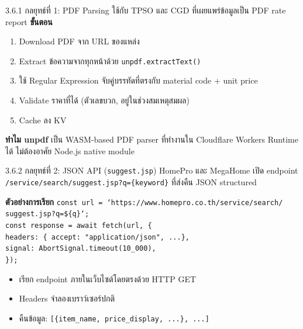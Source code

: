 \documentclass[aspectratio=169,11pt]{beamer}
\begin{document}
\begin{frame}{3.6.1 กลยุทธ์ที่ 1: PDF Parsing}
  ใช้กับ TPSO และ CGD ที่เผยแพร่ข้อมูลเป็น PDF rate report
  \vspace{0.3em}
  \textbf{ขั้นตอน}
  \begin{enumerate}
    \item Download PDF จาก URL ของแหล่ง
    \item Extract ข้อความจากทุกหน้าด้วย \texttt{unpdf.extractText()}
    \item ใช้ Regular Expression จับคู่บรรทัดที่ตรงกับ material code + unit price
    \item Validate ราคาที่ได้ (ตัวเลขบวก, อยู่ในช่วงสมเหตุสมผล)
    \item Cache ลง KV
  \end{enumerate}
  \vspace{0.3em}
  \begin{block}{\textbf{ทำไม unpdf}}
    เป็น WASM-based PDF parser ที่ทำงานใน Cloudflare Workers Runtime ได้
    ไม่ต้องอาศัย Node.js native module
  \end{block}
\end{frame}

\begin{frame}{3.6.2 กลยุทธ์ที่ 2: JSON API (\texttt{suggest.jsp})}
  HomePro และ MegaHome เปิด endpoint
  \texttt{/service/search/suggest.jsp?q=\{keyword\}} ที่ส่งคืน JSON structured
  \vspace{0.3em}
  \begin{exampleblock}{\textbf{ตัวอย่างการเรียก}}
  \footnotesize
  \texttt{const url = `https://www.homepro.co.th/service/search/} \\
  \texttt{\quad suggest.jsp?q=\$\{q\}`;} \\
  \texttt{const response = await fetch(url, \{} \\
  \texttt{\quad headers: \{ accept: "application/json", ...\},} \\
  \texttt{\quad signal: AbortSignal.timeout(10\_000),} \\
  \texttt{\});}
  \end{exampleblock}
  \vspace{0.3em}
  \begin{itemize}
    \item เรียก endpoint ภายในเว็บไซต์โดยตรงด้วย HTTP GET
    \item Headers จำลองเบราว์เซอร์ปกติ
    \item คืนข้อมูล: \texttt{[\{item\_name, price\_display, ...\}, ...]}
  \end{itemize}
\end{frame}
\end{document}
